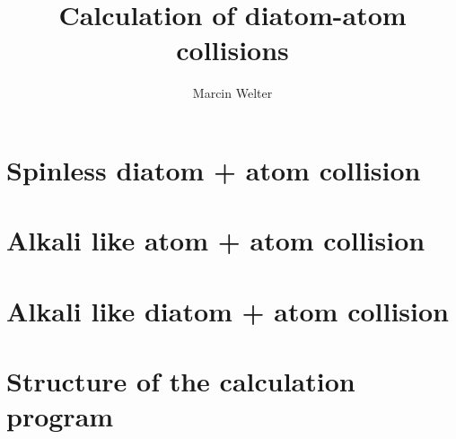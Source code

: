 \documentclass[a4paper]{article}
\title{Calculation of diatom-atom collisions}
\author{Marcin Welter}
\begin{document}
\maketitle

\section{Spinless diatom + atom collision}

\section{Alkali like atom + atom collision}

\section{Alkali like diatom + atom collision}

\section{Structure of the calculation program}
\end{document}
